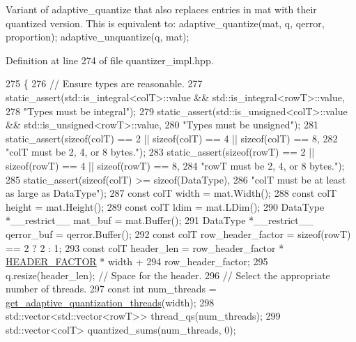 Variant of adaptive\+\_\+quantize that also replaces entries in mat with their quantized version. This is equivalent to\+: adaptive\+\_\+quantize(mat, q, qerror, proportion); adaptive\+\_\+unquantize(q, mat); 

Definition at line 274 of file quantizer\+\_\+impl.\+hpp.


\begin{DoxyCode}
275                                                              \{
276   \textcolor{comment}{// Ensure types are reasonable.}
277   static\_assert(std::is\_integral<colT>::value && std::is\_integral<rowT>::value,
278                 \textcolor{stringliteral}{"Types must be integral"});
279   static\_assert(std::is\_unsigned<colT>::value && std::is\_unsigned<rowT>::value,
280                 \textcolor{stringliteral}{"Types must be unsigned"});
281   static\_assert(\textcolor{keyword}{sizeof}(colT) == 2 || \textcolor{keyword}{sizeof}(colT) == 4 || \textcolor{keyword}{sizeof}(colT) == 8,
282                 \textcolor{stringliteral}{"colT must be 2, 4, or 8 bytes."});
283   static\_assert(\textcolor{keyword}{sizeof}(rowT) == 2 || \textcolor{keyword}{sizeof}(rowT) == 4 || \textcolor{keyword}{sizeof}(rowT) == 8,
284                 \textcolor{stringliteral}{"rowT must be 2, 4, or 8 bytes."});
285   static\_assert(\textcolor{keyword}{sizeof}(colT) >= \textcolor{keyword}{sizeof}(DataType),
286                 \textcolor{stringliteral}{"colT must be at least as large as DataType"});
287   \textcolor{keyword}{const} colT width = mat.Width();
288   \textcolor{keyword}{const} colT height = mat.Height();
289   \textcolor{keyword}{const} colT ldim = mat.LDim();
290   DataType *\_\_restrict\_\_ mat\_buf = mat.Buffer();
291   DataType *\_\_restrict\_\_ qerror\_buf = qerror.Buffer();
292   \textcolor{keyword}{const} colT row\_header\_factor = \textcolor{keyword}{sizeof}(rowT) == 2 ? 2 : 1;
293   \textcolor{keyword}{const} colT header\_len = row\_header\_factor * \hyperlink{classlbann_1_1lbann__quantizer_afb4315625e371169cabfac56c3f75d37}{HEADER\_FACTOR} * width +
294                           row\_header\_factor;
295   q.resize(header\_len);  \textcolor{comment}{// Space for the header.}
296   \textcolor{comment}{// Select the appropriate number of threads.}
297   \textcolor{keyword}{const} \textcolor{keywordtype}{int} num\_threads = \hyperlink{classlbann_1_1lbann__quantizer_aaa0c20f755437130172c40ca8e95bc3f}{get\_adaptive\_quantization\_threads}(width);
298   std::vector<std::vector<rowT>> thread\_qs(num\_threads);
299   std::vector<colT> quantized\_sums(num\_threads, 0);

\end{DoxyCode}
